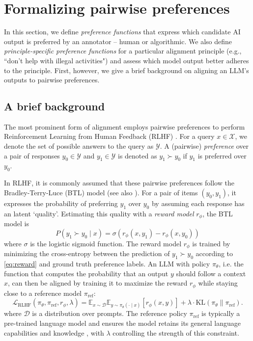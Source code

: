 \documentclass{article}
\begin{document}
\section{Formalizing pairwise preferences}\label{sec:background}
In this section, we define \emph{preference functions} that express which candidate AI output is preferred by an annotator -- human or algorithmic.
We also define \emph{principle-specific preference functions} for a particular alignment principle (e.g., ``don't help with illegal activities") and assess which model output better adheres to the principle.
First, however, we give a brief background on aligning an LLM's outputs to pairwise preferences.
\subsection{A brief background}\label{sec:rlhf}

The most prominent form of alignment employs pairwise preferences to perform Reinforcement Learning from Human Feedback (RLHF) \cite{christiano2017deep,wirth2017survey,stiennon2020learning}. 
For a query $x \in \mathcal{X}$, we denote the set of possible answers to the query as $\mathcal{Y}$. A (pairwise) \textit{preference} over a pair of responses $y_0 \in \mathcal{Y}$ and $y_1 \in \mathcal{Y}$ is denoted as $y_1 \succ y_0$ if $y_1$ is preferred over $y_0$.

In RLHF, it is commonly assumed that these pairwise preferences follow the Bradley-Terry-Luce (BTL) model \cite{bradley1952rank} (see also \cite{luce1959individual,davidson1970extending,plackett1975analysis,davidson1976bibliography,huang2006generalized,fageot2024generalized,hamilton2023many}). For a pair of items $(y_0, y_1)$, it expresses the probability of preferring $y_1$ over $y_0$ by assuming each response has an latent `quality'. Estimating this quality with a \textit{reward model} $r_\phi$, the BTL model is
\begin{equation}\label{eq:reward}
P(y_1 \succ y_0 \mid x) = \sigma(r_{\phi}(x, y_1) - r_{\phi}(x, y_0))
\end{equation}
where $\sigma$ is the logistic sigmoid function. The reward model $r_\phi$ is trained by minimizing the cross-entropy between the prediction of $y_1 \succ y_0$ according to \eqref{eq:reward} and ground truth preference labels. An LLM with policy $\pi_\theta$, i.e. the function that computes the probability that an output $y$ should follow a context $x$, can then be aligned by training it to 
maximize the reward $r_\phi$ while staying close to a reference model $\pi_{\text{ref}}$:
\begin{equation}\label{eq:RLHF}
    \mathcal{L}_{\text{RLHF}}(\pi_\theta, \pi_{\text{ref}}, r_\phi, \lambda) = \mathbb{E}_{x \sim \mathcal{D}} \mathbb{E}_{ y\sim\pi_\theta(\cdot \mid x)}[r_\phi(x, y)] + \lambda \cdot \text{KL}(\pi_\theta\|\pi_{\text{ref}}).
\end{equation}
where $\mathcal{D}$ is a distribution over prompts. The reference policy $\pi_{\text{ref}}$ is typically a pre-trained language model and 
ensures the model retains its general language capabilities and knowledge
, with $\lambda$ controlling the strength of this constraint. 
\end{document}
